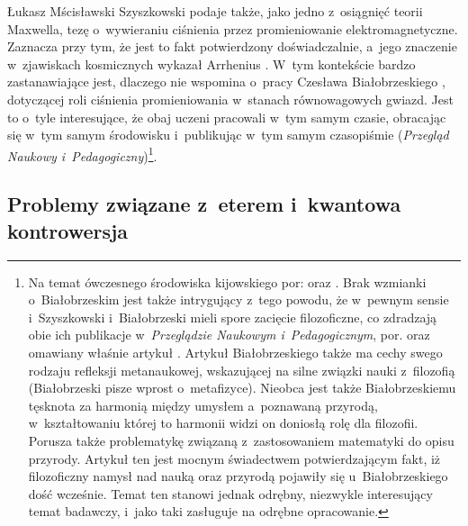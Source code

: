 \begin{artplenv}{Łukasz Mścisławski}
Szyszkowski podaje także, jako jedno z~osiągnięć teorii Maxwella, tezę o~wywieraniu ciśnienia przez promieniowanie elektromagnetyczne. Zaznacza przy tym, że jest to fakt potwierdzony doświadczalnie, a~jego znaczenie w~zjawiskach kosmicznych wykazał Arrhenius
\parencite*[][s.~91–220]{arrhenius_lehrbuch_1903}. %
 W~tym kontekście bardzo zastanawiające jest, dlaczego nie wspomina o~pracy Czesława Białobrzeskiego 
\parencite*[][]{bialobrzeski_sur_1913}, %
 dotyczącej roli ciśnienia promieniowania w~stanach równowagowych gwiazd. Jest to o~tyle interesujące, że obaj uczeni pracowali w~tym samym czasie, obracając się w~tym samym środowisku i~publikując w~tym samym czasopiśmie (\textit{Przegląd Naukowy i~Pedagogiczny})\footnote{Na temat ówczesnego środowiska kijowskiego por: 
\parencite[][]{roziewicz_polskie_1991} %
 oraz 
\parencite[][]{korzeniowski_za_2009}. %
 Brak wzmianki o~Białobrzeskim jest także intrygujący z~tego powodu, że w~pewnym sensie i~Szyszkowski i~Białobrzeski mieli spore zacięcie filozoficzne, co zdradzają obie ich publikacje w~\textit{Przeglądzie Naukowym i~Pedagogicznym}, por. 
\parencite[][]{bialobrzeski_rzeczywistosc_1916} %
 oraz omawiany właśnie artykuł 
\parencite[][]{szyszkowski_o_1916}. %
 Artykuł Białobrzeskiego także ma cechy swego rodzaju refleksji metanaukowej, wskazującej na silne związki nauki z~filozofią (Białobrzeski pisze wprost o~metafizyce). Nieobca jest także Białobrzeskiemu tęsknota za harmonią między umysłem a~poznawaną przyrodą, w~kształtowaniu której to harmonii widzi on doniosłą rolę dla filozofii. Porusza także problematykę związaną z~zastosowaniem matematyki do opisu przyrody. Artykuł ten jest mocnym świadectwem potwierdzającym fakt, iż filozoficzny namysł nad nauką oraz przyrodą pojawiły się u~Białobrzeskiego dość wcześnie. Temat ten stanowi jednak odrębny, niezwykle interesujący temat badawczy, i~jako taki zasługuje na odrębne opracowanie.}.

\subsection{Problemy związane z~eterem i~kwantowa kontrowersja}


\end{artplenv}
